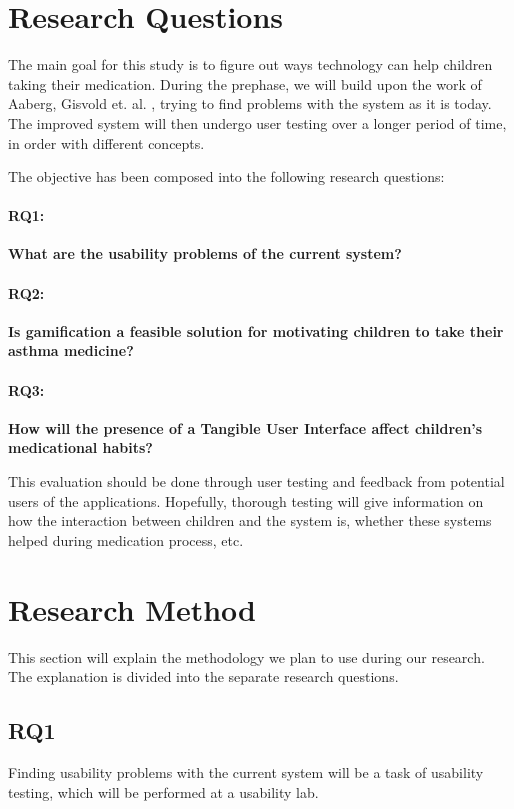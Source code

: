 \section{Research Questions}
\label{sec:researchquestions}
The main goal for this study is to figure out ways technology can help children taking their medication. During the prephase, we will build upon the work of Aaberg, Gisvold et. al.  \cite{CustomerDriven}, trying to find problems with the system as it is today. The improved system will then undergo user testing over a longer period of time, in order with different concepts.


The objective has been composed into the following research questions: 


\paragraph{RQ1:}
\textbf{What are the usability problems of the current system?}


\paragraph{RQ2:}
\textbf{Is gamification a feasible solution for motivating children to take their asthma medicine?}


\paragraph{RQ3:}
\textbf{How will the presence of a Tangible User Interface affect children's medicational habits?}


This evaluation should be done through user testing and feedback from potential users of the applications. Hopefully, thorough testing will give information on how the interaction between children and the system is, whether these systems helped during medication process, etc. 

\section{Research Method}
\label{sec:researchmethod}
This section will explain the methodology we plan to use during our research. The explanation is divided into the separate research questions.  


\subsection{RQ1}
\label{sec:RQ1-methodology}
Finding usability problems with the current system will be a task of usability testing, which will be performed at a usability lab.  



